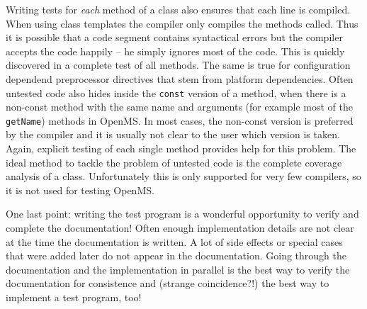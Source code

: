 \documentclass[a4]{article}
\begin{document}
Writing tests for {\em each} method of a class also ensures that each line is
compiled. When using class templates the compiler only compiles the methods
called. Thus it is possible that a code segment contains syntactical errors
but the compiler accepts the code happily -- he simply ignores most of the
code. This is quickly discovered in a complete test of all methods. The same
is true for configuration dependend preprocessor directives that stem from
platform dependencies. Often untested code also hides inside the {\tt const}
version of a method, when there is a non-const method with the same name and
arguments (for example most of the {\tt getName}) methods in OpenMS. In most
cases, the non-const version is preferred by the compiler and it is usually
not clear to the user which version is taken. Again, explicit testing of each
single method provides help for this problem.
The ideal method to tackle the problem of untested code is the complete
coverage analysis of a class. Unfortunately this is only supported for very
few compilers, so it is not used for testing OpenMS.

One last point: writing the
test program is a wonderful opportunity to verify and complete the
documentation! Often enough implementation details are not clear at the time
the documentation is written. A lot of side effects or special cases that were
added later do not appear in the documentation. Going through the
documentation and the implementation in parallel is the best way to verify the
documentation for consistence and (strange coincidence?!) the best way to
implement a test program, too!
\end{document}
